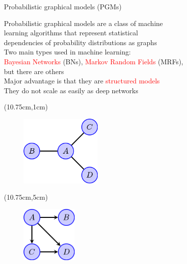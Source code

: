 \documentclass[aspectratio=1610]{beamer}					%
\begin{document}
\begin{frame}{Probabilistic graphical models (PGMs)}

Probabilistic graphical models are a class of machine \\learning algorithms that represent statistical \\dependencies of probability distributions as graphs\\
\vspace{0.2in}
Two main types used in machine learning: \\\textcolor{red}{Bayesian Networks} (BNs), \textcolor{red}{Markov Random Fields} (MRFs), \\but there are others\\
\vspace{0.2in}
Major advantage is that they are \textcolor{red}{structured models}\\They do not scale as easily as deep networks


\begin{textblock*}{5cm}(10.75cm,1cm)
\begin{figure}
\includegraphics[width=4cm]{mrf.png}
\end{figure}
\end{textblock*}

\begin{textblock*}{5cm}(10.75cm,5cm)
\begin{figure}
\includegraphics[width=2.75cm]{bayes-net.png}
\end{figure}
\end{textblock*}

\end{frame}
\end{document}
